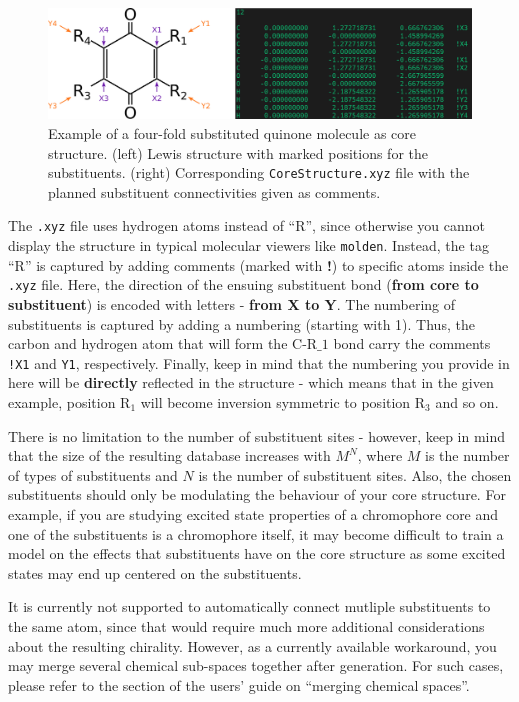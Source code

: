 \documentclass[12pt]{achemso}
\begin{document}
\begin{figure}
  \centering
   \includegraphics[width=16cm]{./resources/01_XYZ_Directionality.png}
  \caption{Example of a four-fold substituted quinone molecule as core structure. (left) Lewis structure with marked positions for the substituents. (right) Corresponding \texttt{CoreStructure.xyz} file with the planned substituent connectivities given as comments.}
  \label{FIG: 01_XYZ}
\end{figure}

\noindent The \texttt{.xyz} file uses hydrogen atoms instead of ``R'', since otherwise you cannot display the structure in typical molecular viewers like \texttt{molden}. Instead, the tag ``R'' is captured by adding comments (marked with \textbf{!}) to specific atoms inside the \texttt{.xyz} file. Here, the direction of the ensuing substituent bond (\textbf{from core to substituent}) is encoded with letters - \textbf{from X to Y}. The numbering of substituents is captured by adding a numbering (starting with 1). Thus, the carbon and hydrogen atom that will form the C-R$\_1$ bond carry the comments \verb+!X1+ and \verb+Y1+, respectively. Finally, keep in mind that the numbering you provide in here will be \textbf{directly} reflected in the structure - which means that in the given example, position R$_1$ will become inversion symmetric to position R$_3$ and so on.

\noindent There is no limitation to the number of substituent sites - however, keep in mind that the size of the resulting database increases with $M^N$, where $M$ is the number of types of substituents and $N$ is the number of substituent sites. Also, the chosen substituents should only be modulating the behaviour of your core structure. For example, if you are studying excited state properties of a chromophore core and one of the substituents is a chromophore itself, it may become difficult to train a model on the effects that substituents have on the core structure as some excited states may end up centered on the substituents.

\noindent It is currently not supported to automatically connect mutliple substituents to the same atom, since that would require much more additional considerations about the resulting chirality. However, as a currently available workaround, you may merge several chemical sub-spaces together after generation. For such cases, please refer to the section of the users' guide on ``merging chemical spaces''.
\end{document}
